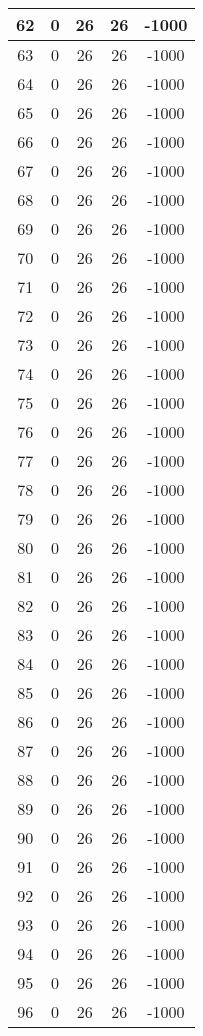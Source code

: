 \documentclass[letterpaper, 12pt]{article}
\begin{document}
\begin{longtable}{|c|c|c|c|c|}
\hline
62 & 0 & 26 & 26 & -1000 \\
\hline
63 & 0 & 26 & 26 & -1000 \\
\hline
64 & 0 & 26 & 26 & -1000 \\
\hline
65 & 0 & 26 & 26 & -1000 \\
\hline
66 & 0 & 26 & 26 & -1000 \\
\hline
67 & 0 & 26 & 26 & -1000 \\
\hline
68 & 0 & 26 & 26 & -1000 \\
\hline
69 & 0 & 26 & 26 & -1000 \\
\hline
70 & 0 & 26 & 26 & -1000 \\
\hline
71 & 0 & 26 & 26 & -1000 \\
\hline
72 & 0 & 26 & 26 & -1000 \\
\hline
73 & 0 & 26 & 26 & -1000 \\
\hline
74 & 0 & 26 & 26 & -1000 \\
\hline
75 & 0 & 26 & 26 & -1000 \\
\hline
76 & 0 & 26 & 26 & -1000 \\
\hline
77 & 0 & 26 & 26 & -1000 \\
\hline
78 & 0 & 26 & 26 & -1000 \\
\hline
79 & 0 & 26 & 26 & -1000 \\
\hline
80 & 0 & 26 & 26 & -1000 \\
\hline
81 & 0 & 26 & 26 & -1000 \\
\hline
82 & 0 & 26 & 26 & -1000 \\
\hline
83 & 0 & 26 & 26 & -1000 \\
\hline
84 & 0 & 26 & 26 & -1000 \\
\hline
85 & 0 & 26 & 26 & -1000 \\
\hline
86 & 0 & 26 & 26 & -1000 \\
\hline
87 & 0 & 26 & 26 & -1000 \\
\hline
88 & 0 & 26 & 26 & -1000 \\
\hline
89 & 0 & 26 & 26 & -1000 \\
\hline
90 & 0 & 26 & 26 & -1000 \\
\hline
91 & 0 & 26 & 26 & -1000 \\
\hline
92 & 0 & 26 & 26 & -1000 \\
\hline
93 & 0 & 26 & 26 & -1000 \\
\hline
94 & 0 & 26 & 26 & -1000 \\
\hline
95 & 0 & 26 & 26 & -1000 \\
\hline
96 & 0 & 26 & 26 & -1000 \\

\end{longtable}
\end{document}
